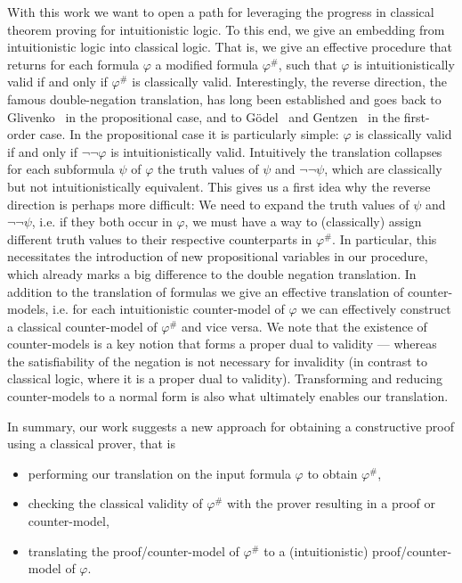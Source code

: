 \documentclass[a4paper,UKenglish,cleveref, autoref, thm-restate]{lipics-v2021}
\begin{document}
With this work we want to open a path for leveraging the progress in classical theorem proving for intuitionistic logic.
To this end, we give an embedding from intuitionistic logic into classical logic. That is, we give an effective procedure that returns for each formula $\varphi$ a modified formula $\varphi^\#$, such that $\varphi$ is intuitionistically valid if and only if $\varphi^\#$ is classically valid.
Interestingly, the reverse direction, the famous double-negation translation, has long been established and goes back to Glivenko~\cite{glivenko1929quelques} in the propositional case, and to G\"odel~\cite{godel1933intuitionistischen} and Gentzen~\cite{gentzen1936widerspruchsfreiheit} in the first-order case. In the propositional case it is particularly simple: $\varphi$ is classically valid if and only if $\neg\neg\varphi$ is intuitionistically valid. Intuitively the translation collapses for each subformula $\psi$ of $\varphi$ the truth values of $\psi$ and $\neg\neg\psi$, which are classically but not intuitionistically equivalent. This gives us a first idea why the reverse direction is perhaps more difficult: We need to expand the truth values of $\psi$ and $\neg\neg\psi$, i.e. if they both occur in $\varphi$, we must have a way to (classically) assign different truth values to their respective counterparts in $\varphi^\#$. In particular, this necessitates the introduction of new propositional variables in our procedure, which already marks a big difference to the double negation translation.
%
In addition to the translation of formulas we give an effective translation of counter-models, i.e. for each intuitionistic counter-model of $\varphi$ we can effectively construct a classical counter-model of $\varphi^\#$ and vice versa.
We note that the existence of counter-models is a key notion that forms a proper dual to validity --- whereas the satisfiability of the negation is not necessary for invalidity (in contrast to classical logic, where it is a proper dual to validity).
Transforming and reducing counter-models to a normal form is also what ultimately enables our translation.

In summary, our work suggests a new approach for obtaining a constructive proof using a classical prover, that is
\begin{itemize}
	\item performing our translation on the input formula $\varphi$ to obtain $\varphi^\#$,
	\item checking the classical validity of $\varphi^\#$ with the prover resulting in a proof or counter-model,
	\item translating the proof/counter-model of $\varphi^\#$ to a (intuitionistic) proof/counter-model of $\varphi$.
\end{itemize}
\end{document}
